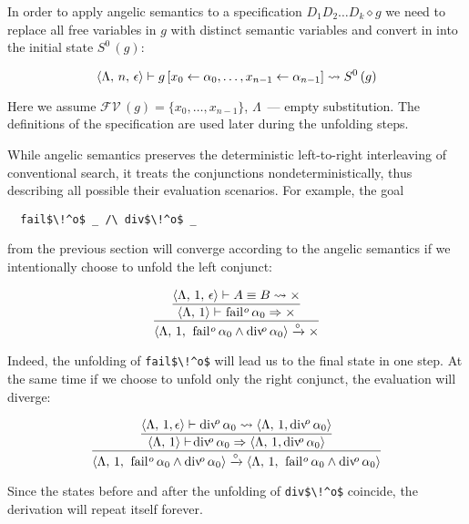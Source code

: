 In order to apply angelic semantics to a specification $D_1 D_2\ldots D_k \diamond g$ we need to replace all free variables in $g$ with distinct semantic
variables and convert in into the initial state $S^0\,(g)$:

\[
\langle \Lambda,\, n,\, \epsilon \rangle \vdash g\,[x_0 \leftarrow \alpha_0, \ldots, x_{n-1} \leftarrow \alpha_{n-1}] \leadsto S^0\,(g)
\]

Here we assume $\mathcal{FV}\,(g)=\{x_0,\dots,x_{n-1}\}$, $\Lambda$~--- empty substitution. The definitions of the specification are used later during the unfolding steps.

While angelic semantics preserves the deterministic left-to-right interleaving of conventional \mk search, it treats the conjunctions nondeterministically, thus
describing all possible their evaluation scenarios. For example, the goal

\begin{lstlisting}
  fail$\!^o$ _ /\ div$\!^o$ _
\end{lstlisting}

from the previous section will converge according to the angelic semantics if we intentionally choose to unfold the left conjunct:

\[
\dfrac
{\dfrac
{\inbr{\Lambda, \, 1,\, \epsilon} \vdash A \equiv B \leadsto \times}
{\inbr{\Lambda,\, 1} \vdash\! \mbox{\lstinline|fail|}\!^o\, \alpha_0  \Rightarrow \times}}
{\inbr{\Lambda,\, 1, \, \mbox{\lstinline|fail|}\!^o\, \alpha_0 \land \mbox{\lstinline|div|}\!^o\, \alpha_0} \xrightarrow{\circ} \times}
\]

Indeed, the unfolding of  \lstinline|fail$\!^o$| will lead us to the final state in one step. At the same time if we choose to unfold only the right conjunct, the
evaluation will diverge:

\[
\dfrac
{\dfrac
{\inbr{\Lambda, \, 1, \epsilon} \vdash \mbox{\lstinline|div|}\!^o\, \alpha_0 \leadsto \inbr{\Lambda, \, 1, \mbox{\lstinline|div|}\!^o\, \alpha_0}}
{\inbr{\Lambda,\, 1} \vdash\! \mbox{\lstinline|div|}\!^o\, \alpha_0  \Rightarrow \inbr{\Lambda, \, 1, \mbox{\lstinline|div|}\!^o\, \alpha_0}}}
{\inbr{\Lambda, \, 1, \, \mbox{\lstinline|fail|}\!^o\, \alpha_0 \land \mbox{\lstinline|div|}\!^o\, \alpha_0} \xrightarrow{\circ} \inbr{\Lambda, \, 1, \, \mbox{\lstinline|fail|}\!^o\, \alpha_0 \land \mbox{\lstinline|div|}\!^o\, \alpha_0}}
\]

Since the states before and after the unfolding of \lstinline|div$\!^o$| coincide, the derivation will repeat itself forever.

